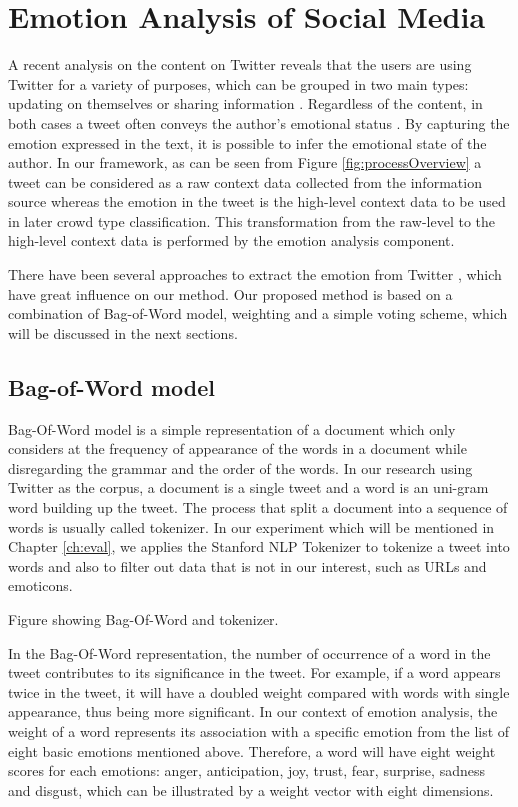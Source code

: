 \section{Emotion Analysis of Social Media}

A recent analysis on the content on Twitter reveals that the users are using Twitter for a variety of purposes, which can be grouped in two main types: updating on themselves or sharing information \citep{java2007we}. Regardless of the content, in both cases a tweet often conveys the author's emotional status \citep{bollen2009modeling}. By capturing the emotion expressed in the text, it is possible to infer the emotional state of the author. In our framework, as can be seen from Figure \ref{fig:processOverview} a tweet can be considered as a raw context data collected from the information source whereas the emotion in the tweet is the high-level context data to be used in later crowd type classification. This transformation from the raw-level to the high-level context data is performed by the emotion analysis component.

There have been several approaches to extract the emotion from Twitter \citep{roberts2012empatweet, bollen2009modeling, mohammad2012emotional, mohammad2014using}, which have great influence on our method. Our proposed method is based on a combination of Bag-of-Word model, weighting and a simple voting scheme, which will be discussed in the next sections.

\subsection{Bag-of-Word model}
Bag-Of-Word model is a simple representation of a document which only considers at the frequency of appearance of the words in a document while disregarding the grammar and the order of the words. In our research using Twitter as the corpus, a document is a single tweet and a word is an uni-gram word building up the tweet. The process that split a document into a sequence of words is usually called tokenizer. In our experiment which will be mentioned in Chapter \ref{ch:eval}, we applies the Stanford NLP Tokenizer to tokenize a tweet into words and also to filter out data that is not in our interest, such as URLs and emoticons. 

Figure showing Bag-Of-Word and tokenizer.

In the Bag-Of-Word representation, the number of occurrence of a word in the tweet contributes to its significance in the tweet. For example, if a word appears twice in the tweet, it will have a doubled weight compared with words with single appearance, thus being more significant. In our context of emotion analysis, the weight of a word represents its association with a specific emotion from the list of eight basic emotions mentioned above. Therefore, a word will have eight weight scores for each emotions: anger, anticipation, joy, trust, fear, surprise, sadness and disgust, which can be illustrated by a weight vector with eight dimensions. 

